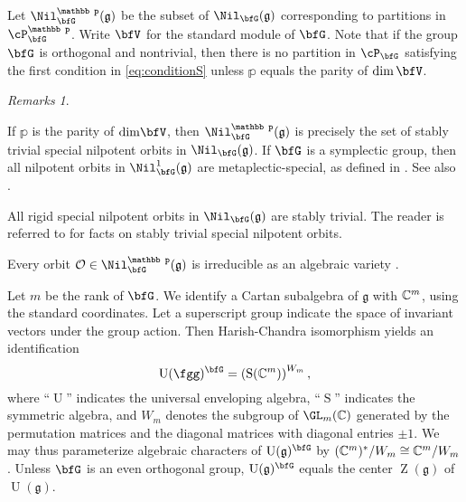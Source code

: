\documentclass[12pt,a4paper]{amsart}
\newcommand{\CO}{{\mathcal {O}}}
\newcommand{\oS}{\operatorname{S}}
\newcommand{\oZ}{\operatorname{Z}}
\newcommand{\oU}{\operatorname{U}}
\newcommand{\g}{\mathfrak g}
\numberwithin{equation}{section}
\theoremstyle{remark}
\newtheorem*{remarks}{Remarks}
\begin{document}
Let $\Nil^{\mathbb p}_{\bfG}(\g)$ be the subset of $\Nil_{\bfG}(\g)$ corresponding to
partitions in $\cP^{\mathbb p}_{\bfG}$. Write $\bfV$ for the standard module of $\bfG$. Note that if the group $\bfG$ is orthogonal and nontrivial, then there is no partition  in $ \cP_{\bfG}$ satisfying the first condition in \eqref{eq:conditionS} unless $\mathbb p$ equals the parity of $\dim \bfV$.

\begin{remarks}
\begin{enumR}

\item  If $\mathbb p$ is the parity of $\dim\!\bfV$,   then  $\Nil^{\mathbb p}_{\bfG}(\g)$ is precisely
  the set of stably trivial special nilpotent orbits in $\Nil_{\bfG}(\g)$.
 If $\bfG$ is a symplectic group, then
 all nilpotent orbits in
  $\Nil^{1}_{\bfG}(\g)$ are metaplectic-special, as defined in \cite{JLS}. See also \cite{Mo96}.
\item All rigid special nilpotent orbits in $\Nil_{\bfG}(\g)$
  are stably trivial. The reader is referred to \cite[Section~2]{B17} for facts on stably trivial special nilpotent orbits.

\item  Every orbit $\CO\in \Nil^{\mathbb p}_{\bfG}(\g)$ is irreducible as an algebraic variety \cite[IV 2.27]{SS}.
\end{enumR}
\end{remarks}





Let $m$ be the rank of $\bfG$. We identify a Cartan subalgebra of $\g$ with
$\mathbb{C}^m$, using the standard coordinates. Let a superscript group indicate the
space of invariant vectors under the group action.  Then Harish-Chandra
isomorphism yields an identification
\[
  \oU(\fgg)^{\bfG}=\left(\oS(\C^m)\right)^{W_m},
\]
where ``$\oU$'' indicates the universal enveloping algebra, ``$\oS$'' indicates
the symmetric algebra, and $W_m$ denotes the subgroup of $\GL_m(\C)$ generated
by the permutation matrices and the diagonal matrices with diagonal entries
$\pm 1$. We may thus parameterize algebraic characters of $\oU(\g)^{\bfG}$ by
$(\mathbb{C}^m)^*/W_m \cong \mathbb{C}^m/W_m$. Unless $\bfG$ is an even orthogonal group,
$\oU(\g)^{\bfG}$ equals the center $\oZ(\g)$ of $\oU(\g)$.

\end{document}
